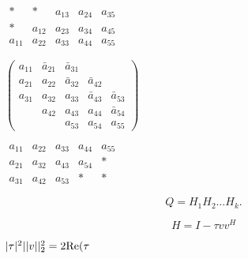 {\newpage\clearpage
{}%
$
\begin{array}{ccccc}
 \ast  &  \ast  & a_{13} & a_{24} & a_{35} \\
 \ast  & a_{12} & a_{23} & a_{34} & a_{45} \\
a_{11} & a_{22} & a_{33} & a_{44} & a_{55}
\end{array}
$%
\lthtmlinlinemathZ
\lthtmlcheckvsize\clearpage}

{\newpage\clearpage
{}%
$
\left( \begin{array}{ccccc}
a_{11} & \bar{a}_{21} & \bar{a}_{31} &              &              \\
a_{21} & a_{22}       & \bar{a}_{32} & \bar{a}_{42} &              \\
a_{31} & a_{32}       & a_{33}       & \bar{a}_{43} & \bar{a}_{53} \\
       & a_{42}       & a_{43}       & a_{44}       & \bar{a}_{54} \\
       &              & a_{53}       & a_{54}       & a_{55}
\end{array} \right)
$%
\lthtmlinlinemathZ
\lthtmlcheckvsize\clearpage}

{\newpage\clearpage
{}%
$
\begin{array}{ccccc}
a_{11} & a_{22} & a_{33} & a_{44} & a_{55} \\
a_{21} & a_{32} & a_{43} & a_{54} &  \ast  \\
a_{31} & a_{42} & a_{53} &  \ast  &  \ast 
\end{array}
$%
\lthtmlinlinemathZ
\lthtmlcheckvsize\clearpage}

{\newpage\clearpage
{}%
\begin{displaymath} Q = H_{1} H_{2} \ldots H_{k}. \end{displaymath}%
\lthtmldisplayZ
\lthtmlcheckvsize\clearpage}

{\newpage\clearpage
{}%
\begin{displaymath}
H = I - \tau v v^{H}
\end{displaymath}%
\lthtmldisplayZ
\lthtmlcheckvsize\clearpage}

{\newpage\clearpage
{}%
$| \tau | ^2   || v || _2 ^2 = 2 \rm {Re}(\tau$%
\lthtmlinlinemathZ
\lthtmlcheckvsize\clearpage}

